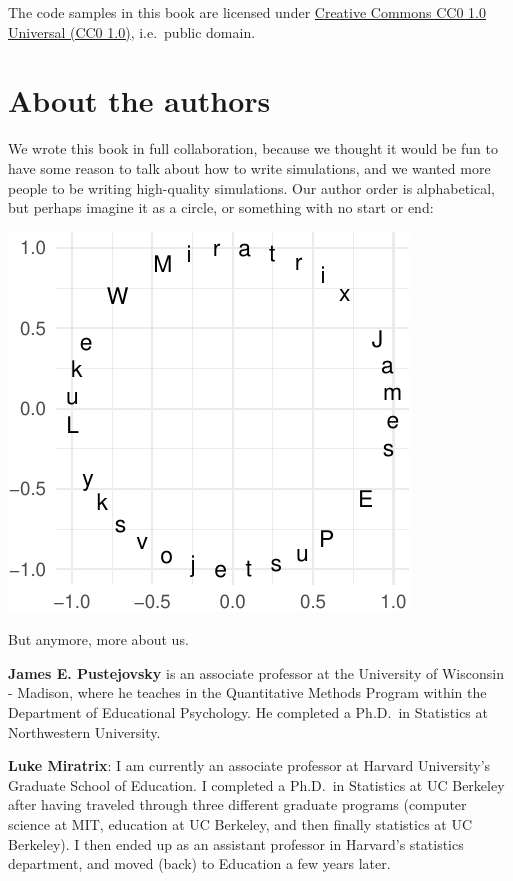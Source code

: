 \documentclass[
]{book}
\begin{document}
The code samples in this book are licensed under \href{https://creativecommons.org/publicdomain/zero/1.0/}{Creative Commons CC0 1.0 Universal (CC0 1.0)}, i.e.~public domain.

\hypertarget{about-the-authors}{%
\section*{About the authors}\label{about-the-authors}}

We wrote this book in full collaboration, because we thought it would be fun to have some reason to talk about how to write simulations, and we wanted more people to be writing high-quality simulations.
Our author order is alphabetical, but perhaps imagine it as a circle, or something with no start or end:

\begin{center}\includegraphics[width=0.75\linewidth]{Designing-Simulations-in-R_files/figure-latex/unnamed-chunk-2-1} \end{center}

But anymore, more about us.

\textbf{James E. Pustejovsky} is an associate professor at the University of Wisconsin - Madison, where he teaches in the Quantitative Methods Program within the Department of Educational Psychology. He completed a Ph.D.~in Statistics at Northwestern University.

\textbf{Luke Miratrix}: I am currently an associate professor at Harvard University's Graduate School of Education. I completed a Ph.D.~in Statistics at UC Berkeley after having traveled through three different graduate programs (computer science at MIT, education at UC Berkeley, and then finally statistics at UC Berkeley).
I then ended up as an assistant professor in Harvard's statistics department, and moved (back) to Education a few years later.
\end{document}
